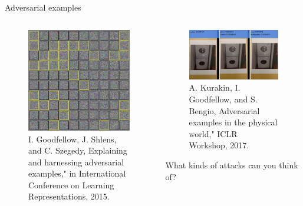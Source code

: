\begin{frame}{Adversarial examples}
\begin{columns}
\begin{column}{.5\textwidth}
	\begin{figure}
		\includegraphics[width=.8\textwidth]{figures/adverserial-example-1}
		\caption*{\tiny{I. Goodfellow, J. Shlens, and C. Szegedy, Explaining and
				harnessing adversarial examples," in International Conference on Learning Representations, 2015.}}
	\end{figure}
\end{column}
\begin{column}{.5\textwidth}
	\begin{figure}
		\includegraphics[width=1\textwidth]{figures/adverserial-example-2}
		\caption*{\tiny{A. Kurakin, I. Goodfellow, and S. Bengio, Adversarial
				examples in the physical world," ICLR Workshop, 2017.}}
	\end{figure}
	What kinds of attacks can you think of?
\end{column}
\end{columns}
\end{frame}

